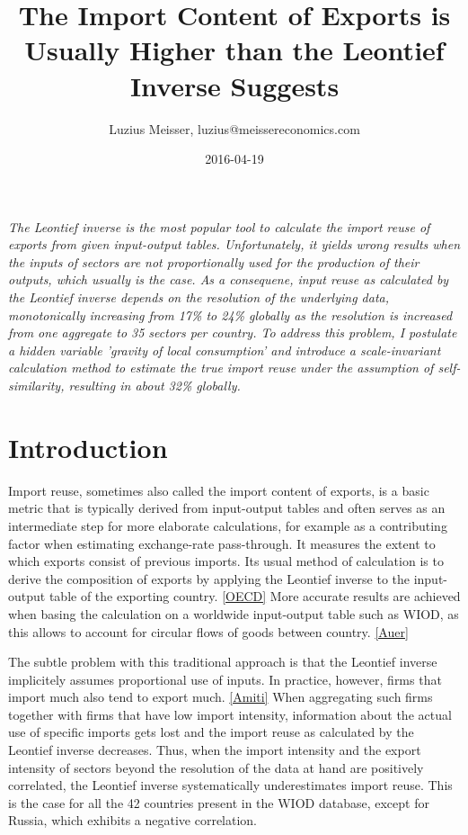 \documentclass[english]{uzhpub}
\begin{document}
\title{The Import Content of Exports is Usually Higher than the Leontief Inverse Suggests}


\author{Luzius Meisser, luzius@meissereconomics.com}

\date{2016-04-19}

\maketitle

\emph{The Leontief inverse is the most popular tool to calculate the import reuse of exports from given input-output tables. Unfortunately, it yields wrong results when the inputs of sectors are not proportionally used for the production of their outputs, which usually is the case. As a consequene, input reuse as calculated by the Leontief inverse depends on the resolution of the underlying data, monotonically increasing from 17\% to 24\% globally as the resolution is increased from one aggregate to 35 sectors per country. To address this problem, I postulate a hidden variable 'gravity of local consumption' and introduce a scale-invariant calculation method to estimate the true import reuse under the assumption of self-similarity, resulting in about 32\% globally.}

\section{Introduction}
Import reuse, sometimes also called the import content of exports, is a basic metric that is typically derived from input-output tables and often serves as an intermediate step for more elaborate calculations, for example as a contributing factor when estimating exchange-rate pass-through. It measures the extent to which exports consist of previous imports. Its usual method of calculation is to derive the composition of exports by applying the Leontief inverse to the input-output table of the exporting country. \ref{OECD} More accurate results are achieved when basing the calculation on a worldwide input-output table such as WIOD, as this allows to account for circular flows of goods between country. \ref{Auer}

The subtle problem with this traditional approach is that the Leontief inverse implicitely assumes proportional use of inputs. In practice, however, firms that import much also tend to export much. \ref{Amiti} When aggregating such firms together with firms that have low import intensity, information about the actual use of specific imports gets lost and the import reuse as calculated by the Leontief inverse decreases. Thus, when the import intensity and the export intensity of sectors beyond the resolution of the data at hand are positively correlated, the Leontief inverse systematically underestimates import reuse. This is the case for all the 42 countries present in the WIOD database, except for Russia, which exhibits a negative correlation.
\end{document}
